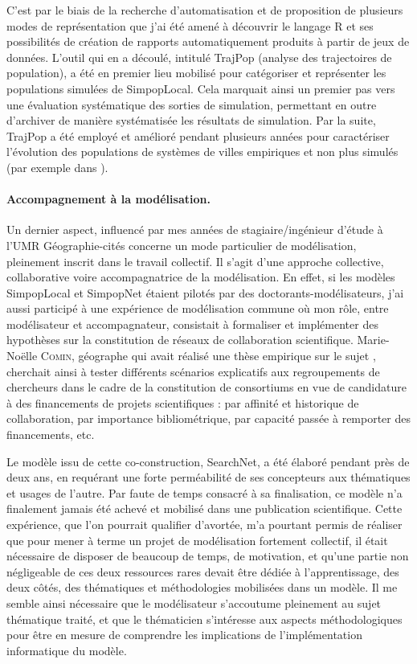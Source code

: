 C'est par le biais de la recherche d'automatisation et de proposition de plusieurs modes de représentation que j'ai été amené à découvrir le langage R et ses possibilités de création de rapports automatiquement produits à partir de jeux de données.
L'outil qui en a découlé, intitulé TrajPop (analyse des trajectoires de population), a été en premier lieu mobilisé pour catégoriser et représenter les populations simulées de SimpopLocal.
Cela marquait ainsi un premier pas vers une évaluation systématique des sorties de simulation, permettant en outre d'archiver de manière systématisée les résultats de simulation.
Par la suite, TrajPop a été employé et amélioré pendant plusieurs années pour caractériser l'évolution des populations de systèmes de villes empiriques et non plus simulés (par exemple dans \textcite{pumain_multilevel_2015}).

\paragraph{Accompagnement à la modélisation.}

Un dernier aspect, influencé par mes années de stagiaire/ingénieur d'étude à l'UMR Géographie-cités concerne un mode particulier de modélisation, pleinement inscrit dans le travail collectif.
Il s'agit d'une approche collective, collaborative voire accompagnatrice de la modélisation.
En effet, si les modèles SimpopLocal et SimpopNet étaient pilotés par des doctorants-modélisateurs, j'ai aussi participé à une expérience de modélisation commune où mon rôle, entre modélisateur et accompagnateur, consistait à formaliser et implémenter des hypothèses sur la constitution de réseaux de collaboration scientifique.
Marie-Noëlle \textsc{Comin}, géographe qui avait réalisé une thèse empirique sur le sujet \autocite{comin_reseaux_2009}, cherchait ainsi à tester différents scénarios explicatifs aux regroupements de chercheurs dans le cadre de la constitution de consortiums en vue de candidature à des financements de projets scientifiques :
par affinité et historique de collaboration, par importance bibliométrique, par capacité passée à remporter des financements, etc.

Le modèle issu de cette co-construction, SearchNet, a été élaboré pendant près de deux ans, en requérant une forte perméabilité de ses concepteurs aux thématiques et usages de l'autre.
Par faute de temps consacré à sa finalisation, ce modèle n'a finalement jamais été achevé et mobilisé dans une publication scientifique.
Cette expérience, que l'on pourrait qualifier d'avortée, m'a pourtant permis de réaliser que pour mener à terme un projet de modélisation fortement collectif, il était nécessaire de disposer de beaucoup de temps, de motivation, et qu'une partie non négligeable de ces deux ressources rares devait être dédiée à l'apprentissage, des deux côtés, des thématiques et méthodologies mobilisées dans un modèle.
Il me semble ainsi nécessaire que le modélisateur s'accoutume pleinement au sujet thématique traité, et que le thématicien s'intéresse aux aspects méthodologiques pour être en mesure de comprendre les implications de l'implémentation informatique du modèle.

